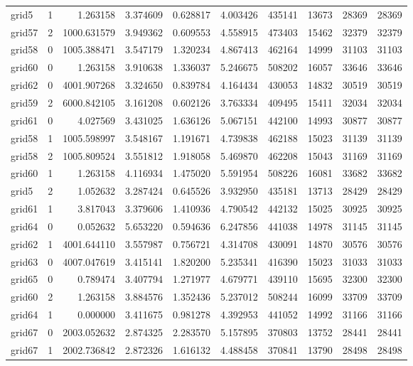 \begin{longtable}{|l|r|r|r|r|r|r|r|r|r|}
grid5 & 1 & 1.263158 & 3.374609 & 0.628817 & 4.003426 & 435141 & 13673 & 28369 & 28369 \\
grid57 & 2 & 1000.631579 & 3.949362 & 0.609553 & 4.558915 & 473403 & 15462 & 32379 & 32379 \\
grid58 & 0 & 1005.388471 & 3.547179 & 1.320234 & 4.867413 & 462164 & 14999 & 31103 & 31103 \\
grid60 & 0 & 1.263158 & 3.910638 & 1.336037 & 5.246675 & 508202 & 16057 & 33646 & 33646 \\
grid62 & 0 & 4001.907268 & 3.324650 & 0.839784 & 4.164434 & 430053 & 14832 & 30519 & 30519 \\
grid59 & 2 & 6000.842105 & 3.161208 & 0.602126 & 3.763334 & 409495 & 15411 & 32034 & 32034 \\
grid61 & 0 & 4.027569 & 3.431025 & 1.636126 & 5.067151 & 442100 & 14993 & 30877 & 30877 \\
grid58 & 1 & 1005.598997 & 3.548167 & 1.191671 & 4.739838 & 462188 & 15023 & 31139 & 31139 \\
grid58 & 2 & 1005.809524 & 3.551812 & 1.918058 & 5.469870 & 462208 & 15043 & 31169 & 31169 \\
grid60 & 1 & 1.263158 & 4.116934 & 1.475020 & 5.591954 & 508226 & 16081 & 33682 & 33682 \\
grid5 & 2 & 1.052632 & 3.287424 & 0.645526 & 3.932950 & 435181 & 13713 & 28429 & 28429 \\
grid61 & 1 & 3.817043 & 3.379606 & 1.410936 & 4.790542 & 442132 & 15025 & 30925 & 30925 \\
grid64 & 0 & 0.052632 & 5.653220 & 0.594636 & 6.247856 & 441038 & 14978 & 31145 & 31145 \\
grid62 & 1 & 4001.644110 & 3.557987 & 0.756721 & 4.314708 & 430091 & 14870 & 30576 & 30576 \\
grid63 & 0 & 4007.047619 & 3.415141 & 1.820200 & 5.235341 & 416390 & 15023 & 31033 & 31033 \\
grid65 & 0 & 0.789474 & 3.407794 & 1.271977 & 4.679771 & 439110 & 15695 & 32300 & 32300 \\
grid60 & 2 & 1.263158 & 3.884576 & 1.352436 & 5.237012 & 508244 & 16099 & 33709 & 33709 \\
grid64 & 1 & 0.000000 & 3.411675 & 0.981278 & 4.392953 & 441052 & 14992 & 31166 & 31166 \\
grid67 & 0 & 2003.052632 & 2.874325 & 2.283570 & 5.157895 & 370803 & 13752 & 28441 & 28441 \\
grid67 & 1 & 2002.736842 & 2.872326 & 1.616132 & 4.488458 & 370841 & 13790 & 28498 & 28498 \\

\end{longtable}
